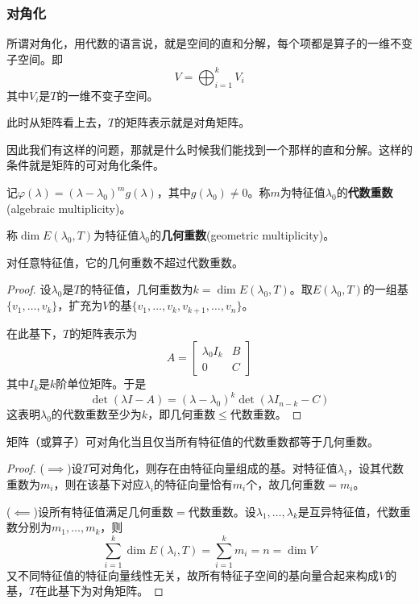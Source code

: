 \subsubsection{对角化}

所谓对角化，用代数的语言说，就是空间的直和分解，每个项都是算子的一维不变子空间。即
\[
V = \bigoplus_{i=1}^{k} V_i
\]
其中$V_i$是$T$的一维不变子空间。

此时从矩阵看上去，$T$的矩阵表示就是对角矩阵。

因此我们有这样的问题，那就是什么时候我们能找到一个那样的直和分解。这样的条件就是矩阵的可对角化条件。

\begin{definition}[代数重数与几何重数]
记$\varphi(\lambda) = (\lambda - \lambda_0)^m g(\lambda)$，其中$g(\lambda_0) \neq 0$。称$m$为特征值$\lambda_0$的\textbf{代数重数}(algebraic multiplicity)。

称$\dim E(\lambda_0, T)$为特征值$\lambda_0$的\textbf{几何重数}(geometric multiplicity)。
\end{definition}

\begin{theorem}
对任意特征值，它的几何重数不超过代数重数。
\end{theorem}

\begin{proof}
设$\lambda_0$是$T$的特征值，几何重数为$k = \dim E(\lambda_0, T)$。取$E(\lambda_0, T)$的一组基$\{v_1, \ldots, v_k\}$，扩充为$V$的基$\{v_1, \ldots, v_k, v_{k+1}, \ldots, v_n\}$。

在此基下，$T$的矩阵表示为
\[
A = \begin{bmatrix} \lambda_0 I_k & B \\ 0 & C \end{bmatrix}
\]
其中$I_k$是$k$阶单位矩阵。于是
\[
\det(\lambda I - A) = (\lambda - \lambda_0)^k \det(\lambda I_{n-k} - C)
\]
这表明$\lambda_0$的代数重数至少为$k$，即几何重数$\leq$代数重数。
\end{proof}

\begin{theorem}[对角化判定]
矩阵（或算子）可对角化当且仅当所有特征值的代数重数都等于几何重数。
\end{theorem}

\begin{proof}
($\implies$)设$T$可对角化，则存在由特征向量组成的基。对特征值$\lambda_i$，设其代数重数为$m_i$，则在该基下对应$\lambda_i$的特征向量恰有$m_i$个，故几何重数$= m_i$。

($\impliedby$)设所有特征值满足几何重数$=$代数重数。设$\lambda_1, \ldots, \lambda_k$是互异特征值，代数重数分别为$m_1, \ldots, m_k$，则
\[
\sum_{i=1}^{k} \dim E(\lambda_i, T) = \sum_{i=1}^{k} m_i = n = \dim V
\]
又不同特征值的特征向量线性无关，故所有特征子空间的基向量合起来构成$V$的基，$T$在此基下为对角矩阵。
\end{proof}

